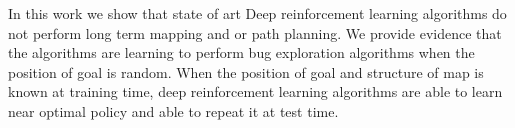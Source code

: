 In this work we show that state of art Deep reinforcement learning algorithms do not perform long term mapping and or path planning.
We provide evidence that the algorithms are learning to perform bug exploration algorithms when the position of goal is random. When the position of goal and structure of map is known at training time, deep reinforcement learning algorithms
are able to learn near optimal policy and able to repeat it at test time.
